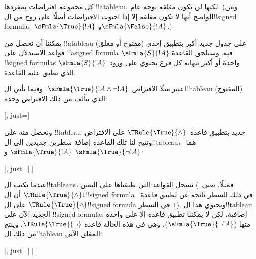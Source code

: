 \documentclass[../../../include/open-logic-section]{subfiles}
\begin{document}
\begin{ex}
  كل مجموعة افتراضات بمفردها !!a{tableau}، لكنها لن تكون مغلقة بوجه
  عام. (ومن الواضح أنها لا تكون مغلقة إلا إذا احتوت الافتراضات أصلًا
  على زوج من ال!!{signed formula}s~$\sFmla{\True}{!A}$
  و$\sFmla{\False}{!A}$.)

  يمكننا أن نحصل من !!a{tableau} (مفتوح أو مغلق) على جدول جديد أكبر
  بتطبيق إحدى قواعد الاستدلال على !!a{signed formula}
  $\sFmla{S}{!A}$ فيه. وستلحق القاعدة !!{signed formula}s واحدة أو أكثر
  بنهاية كل فرع يحتوي على ورود~$\sFmla{S}{!A}$ الذي نطبق عليه القاعدة.

  اعتبر مثلًا الافتراض~$\sFmla{\True}{!A \land \lnot !A}$. وفيما يأتي
  ال!!{tableau} (المفتوح) الذي يتألف من ذلك الافتراض وحده:
  \begin{center}
    \begin{tableau}{}
      [, just=\TAss]
    \end{tableau}{}
  \end{center}
  ونحصل منه على !!{tableau} جديد بتطبيق قاعدة~$\TRule{\True}{\land}$
  على الافتراض. وتتيح لنا تلك القاعدة إضافة سطرين جديدين إلى
  ال!!{tableau}، هما~$\sFmla{\True}{!A}$ و
  $\sFmla{\True}{\lnot !A}$:
  \begin{center}
    \begin{tableau}{}
      [, just=\TAss
        [\sFmla{\True}{\formula{A}}, just={\TRule{\True}{\land}[1]},
          [\sFmla{\True}{\lnot \formula{A}}, just={\TRule{\True}{\land}[1]}
          ]
        ]
      ]
    \end{tableau}{}
  \end{center}
  عندما نكتب ال!!{tableau}s، نسجل القواعد التي طبقناها على اليمين
  (فمثلًا، تعني~$\TRule{\True}{\land} 1$ أن ال!!{signed formula} في ذلك
  السطر ناتجة عن تطبيق قاعدة~$\TRule{\True}{\land}$ على ال!!{signed formula}
  في السطر~$1$). ويحتوي هذا ال!!{tableau} الجديد الآن على
  !!{signed formula}s إضافية، لكن لا يمكننا تطبيق قاعدة إلا على واحدة
  منها ($\sFmla{\True}{\lnot !A}$)، وهي في هذه الحالة قاعدة
  $\TRule{\True}{\lnot}$. وينتج من ذلك ال!!{tableau} المغلق الآتي:
  \begin{center}
    \begin{tableau}{}
      [, just=\TAss
        [\sFmla{\True}{\formula{A}}, just={\TRule{\True}{\land}[1]}
          [\sFmla{\True}{\lnot \formula{A}}, just={\TRule{\True}{\land}[1]}
            [\sFmla{\False}{\formula{A}}, just={\TRule{\True}{\lnot}[3]}, close]
          ]
        ]
      ]
    \end{tableau}{}
  \end{center}
\end{ex}
\end{document}
